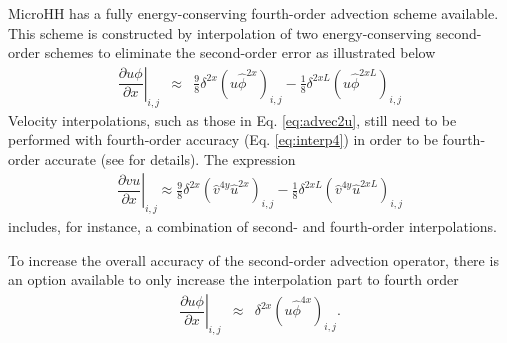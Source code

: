 \documentclass[gmd]{copernicus}
\begin{document}
MicroHH has a fully energy-conserving fourth-order advection scheme \citep{Morinishi1998} available. This scheme is constructed by interpolation of two energy-conserving second-order schemes to eliminate the second-order error as illustrated below
\begin{eqnarray}
\left. \dfrac{\partial u \phi}{\partial x} \right|_{i,j} & \approx & \frac{9}{8} \delta^{2x} \left( u \widehat{\phi}^{2x} \right)_{i,j} 
                                                             - \frac{1}{8} \delta^{2xL} \left( u \widehat{\phi}^{2xL} \right)_{i,j}%
\end{eqnarray}
Velocity interpolations, such as those in Eq. \ref{eq:advec2u}, still need to be performed with fourth-order accuracy (Eq. \ref{eq:interp4}) in order to  be fourth-order accurate (see \citet{Morinishi1998} for details). The expression
\begin{eqnarray}
\left. \dfrac{\partial v u}{\partial x}\right|_{i,j} \approx \frac{9}{8} \delta^{2x} \left( \widehat{v}^{4y} \widehat{u}^{2x} \right)_{i,j} 
                                       - \frac{1}{8} \delta^{2xL} \left( \widehat{v}^{4y} \widehat{u}^{2xL} \right)_{i,j}
\end{eqnarray}
includes, for instance, a combination of second- and fourth-order interpolations.

To increase the overall accuracy of the second-order advection operator, there is an option available to only increase the interpolation part to fourth order
\begin{eqnarray}
\left. \dfrac{\partial u \phi}{\partial x}\right|_{i,j}
& \approx & 
\delta^{2x} \left( u \widehat{\phi}^{4x} \right)_{i,j}.
\end{eqnarray}
\end{document}
